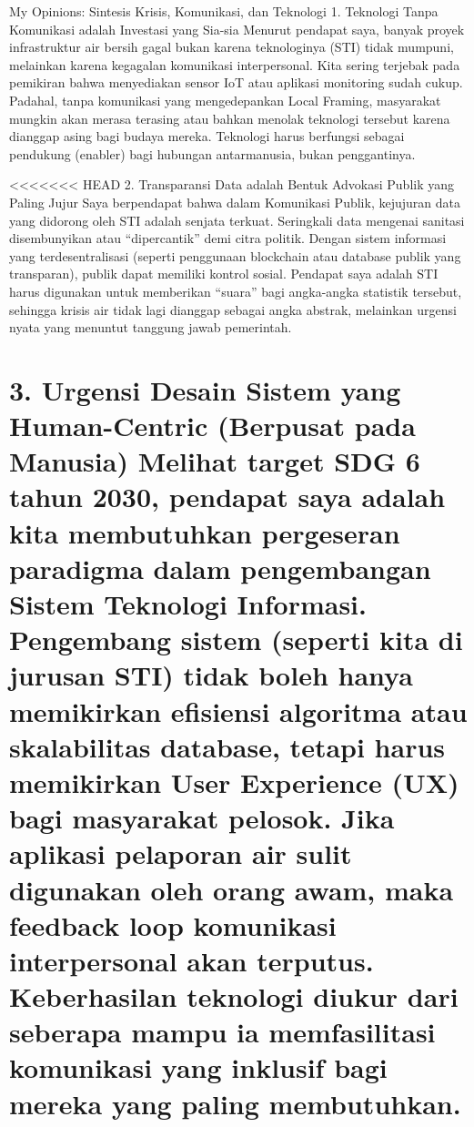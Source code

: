 \documentclass[
  letterpaper,
  DIV=11,
  numbers=noendperiod]{scrreprt}
\begin{document}
My Opinions: Sintesis Krisis, Komunikasi, dan Teknologi 1. Teknologi
Tanpa Komunikasi adalah Investasi yang Sia-sia Menurut pendapat saya,
banyak proyek infrastruktur air bersih gagal bukan karena teknologinya
(STI) tidak mumpuni, melainkan karena kegagalan komunikasi
interpersonal. Kita sering terjebak pada pemikiran bahwa menyediakan
sensor IoT atau aplikasi monitoring sudah cukup. Padahal, tanpa
komunikasi yang mengedepankan Local Framing, masyarakat mungkin akan
merasa terasing atau bahkan menolak teknologi tersebut karena dianggap
asing bagi budaya mereka. Teknologi harus berfungsi sebagai pendukung
(enabler) bagi hubungan antarmanusia, bukan penggantinya.

\textless\textless\textless\textless\textless\textless\textless{} HEAD
2. Transparansi Data adalah Bentuk Advokasi Publik yang Paling Jujur
Saya berpendapat bahwa dalam Komunikasi Publik, kejujuran data yang
didorong oleh STI adalah senjata terkuat. Seringkali data mengenai
sanitasi disembunyikan atau ``dipercantik'' demi citra politik. Dengan
sistem informasi yang terdesentralisasi (seperti penggunaan blockchain
atau database publik yang transparan), publik dapat memiliki kontrol
sosial. Pendapat saya adalah STI harus digunakan untuk memberikan
``suara'' bagi angka-angka statistik tersebut, sehingga krisis air tidak
lagi dianggap sebagai angka abstrak, melainkan urgensi nyata yang
menuntut tanggung jawab pemerintah.


\chapter{3. Urgensi Desain Sistem yang Human-Centric (Berpusat pada
Manusia) Melihat target SDG 6 tahun 2030, pendapat saya adalah kita
membutuhkan pergeseran paradigma dalam pengembangan Sistem Teknologi
Informasi. Pengembang sistem (seperti kita di jurusan STI) tidak boleh
hanya memikirkan efisiensi algoritma atau skalabilitas database, tetapi
harus memikirkan User Experience (UX) bagi masyarakat pelosok. Jika
aplikasi pelaporan air sulit digunakan oleh orang awam, maka feedback
loop komunikasi interpersonal akan terputus. Keberhasilan teknologi
diukur dari seberapa mampu ia memfasilitasi komunikasi yang inklusif
bagi mereka yang paling
membutuhkan.}\label{urgensi-desain-sistem-yang-human-centric-berpusat-pada-manusia-melihat-target-sdg-6-tahun-2030-pendapat-saya-adalah-kita-membutuhkan-pergeseran-paradigma-dalam-pengembangan-sistem-teknologi-informasi.-pengembang-sistem-seperti-kita-di-jurusan-sti-tidak-boleh-hanya-memikirkan-efisiensi-algoritma-atau-skalabilitas-database-tetapi-harus-memikirkan-user-experience-ux-bagi-masyarakat-pelosok.-jika-aplikasi-pelaporan-air-sulit-digunakan-oleh-orang-awam-maka-feedback-loop-komunikasi-interpersonal-akan-terputus.-keberhasilan-teknologi-diukur-dari-seberapa-mampu-ia-memfasilitasi-komunikasi-yang-inklusif-bagi-mereka-yang-paling-membutuhkan.}
\end{document}

